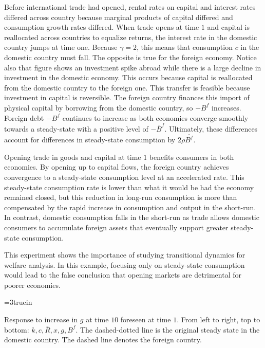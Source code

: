 Before international  trade had opened, rental rates on capital and interest rates differed across country because
marginal products of capital differed and consumption growth rates differed.  When trade opens at
time $1$ and  capital is reallocated across countries to equalize returns,  the interest rate in the domestic country
jumps  at time one. Because $\gamma =2$, this means that consumption $c$ in the domestic country  must fall. The opposite is
true for the foreign economy. Notice also that figure  shows an
investment spike abroad while  there is a large decline in investment in
the domestic economy. This occurs because capital is reallocated from the domestic country to the foreign one.
This transfer is feasible because investment in capital is
reversible. The foreign country finances this import of physical capital by borrowing from the domestic
country, so $- B^f$ increases. %
 Foreign debt $- B^f$  continues to increase as both economies converge smoothly towards a
steady-state with a positive level of $- \overline{B}^f$. Ultimately, these
differences account for differences in steady-state consumption by $2 \rho
\overline{B^f}$.

Opening trade in goods and capital at time $1$ benefits consumers in both economies.
 By
 opening up  to capital flows, the foreign country achieves convergence to
a steady-state consumption level at an accelerated rate. This steady-state
consumption rate is lower than what it would be had the economy remained
closed, but this reduction in long-run consumption is more than compensated
by the rapid increase in consumption and output in  the short-run. In contrast, domestic consumption
falls in the short-run as trade allows domestic consumers to accumulate
foreign assets that  eventually support  greater steady-state consumption.

This experiment shows the importance of studying transitional dynamics for
welfare analysis. In this example, focusing only on steady-state consumption
would lead to the false conclusion that opening markets are detrimental for
poorer economies.


\centerline{\epsfxsize=3truein}
\caption{Response to  increase in $g$ at time $10$ foreseen at time $1$.
From left to right, top to bottom: $k, c, \bar R, x, g, B^f$. The dashed-dotted  line is the original
steady state in the domestic country.  The dashed line denotes the foreign country.}
\endfigure





